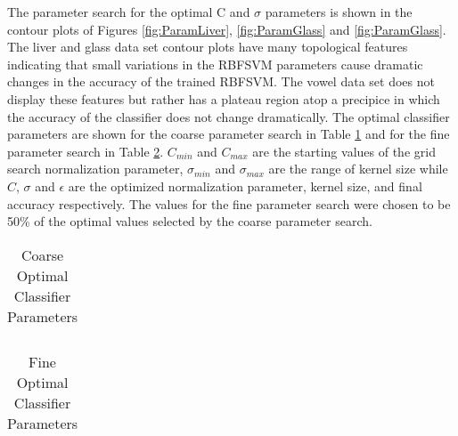 The parameter search for the optimal C and $\sigma$ parameters is shown in the contour plots of Figures \ref{fig:ParamLiver}, \ref{fig:ParamGlass} and \ref{fig:ParamGlass}.
The liver and glass data set contour plots have many topological features indicating that small variations in the RBFSVM parameters cause dramatic changes in the accuracy of the trained RBFSVM.
The vowel data set does not display these features but rather has a plateau region atop a precipice in which the accuracy of the classifier does not change dramatically.
The optimal classifier parameters are shown for the coarse parameter search in Table \ref{tab:CoarseParamValues} and for the fine parameter search in Table \ref{tab:FineParamValues}. $C_{min}$ and $C_{max}$ are the starting values of the grid search normalization parameter, $\sigma_{min}$ and $\sigma_{max}$ are the range of kernel size while $C$, $\sigma$ and $\epsilon$ are the optimized normalization parameter, kernel size, and final accuracy respectively.
The values for the fine parameter search were chosen to be 50\% of the optimal values selected by the coarse parameter search.
\begin{table}[h!]
\caption{Coarse Optimal Classifier Parameters}
\label{tab:CoarseParamValues}
\centering
\begin{tabular}{c c c c c c c c}
\hline

\hline
\end{tabular}
\end{table}
\begin{table}[!ht]
\caption{Fine Optimal Classifier Parameters}
\label{tab:FineParamValues}
\centering
\begin{tabular}{c c c c c c c c}
\hline

\hline
\end{tabular}
\end{table}
